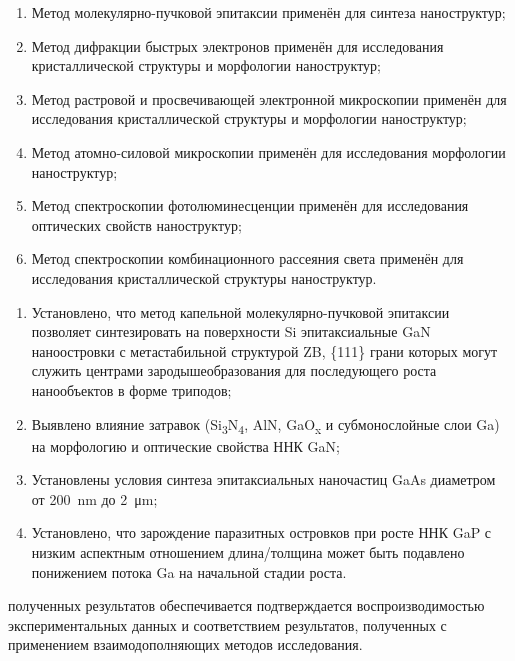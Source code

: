 {\methods}
\begin{enumerate}[beginpenalty=10000]
  \item Метод молекулярно-пучковой эпитаксии применён для синтеза наноструктур;
  \item Метод дифракции быстрых электронов применён для исследования кристаллической структуры и морфологии наноструктур;
  \item Метод растровой и просвечивающей электронной микроскопии применён для исследования кристаллической структуры и морфологии наноструктур;
  \item Метод атомно-силовой микроскопии применён для исследования морфологии наноструктур;
  \item Метод спектроскопии фотолюминесценции применён для исследования оптических свойств наноструктур;
  \item Метод спектроскопии комбинационного рассеяния света применён для исследования кристаллической структуры наноструктур.
\end{enumerate}

{}
\begin{enumerate}[beginpenalty=10000] %
  \item	Установлено, что метод капельной молекулярно-пучковой эпитаксии позволяет синтезировать на поверхности Si эпитаксиальные GaN наноостровки с метастабильной структурой ZB, \{111\} грани которых могут служить центрами зародышеобразования для последующего роста нанообъектов в форме триподов;
  \item Выявлено влияние затравок (Si\textsubscript{3}N\textsubscript{4}, AlN, GaO\textsubscript{x} и субмонослойные слои Ga) на морфологию и оптические свойства ННК GaN;
  \item Установлены условия синтеза эпитаксиальных наночастиц GaAs диаметром от 200~\si{\nano\metre} до 2~\si{\micro\metre};
  \item Установлено, что зарождение паразитных островков при росте ННК GaP с низким аспектным отношением длина/толщина может быть подавлено понижением потока Ga на начальной стадии роста.
\end{enumerate}

{\reliability} полученных результатов обеспечивается подтверждается воспроизводимостью экспериментальных данных и соответствием результатов, полученных с применением взаимодополняющих методов исследования.


